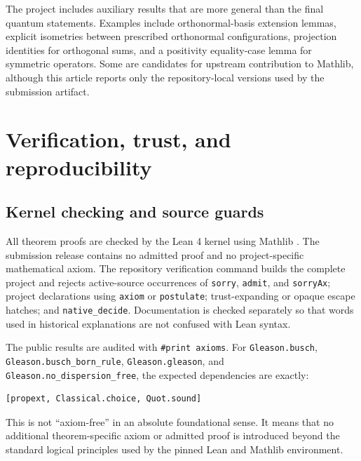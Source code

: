 \documentclass[pdflatex,sn-mathphys-num]{sn-jnl}
\providecommand{\passthrough}[1]{#1}
\theoremstyle{thmstyleone}
\theoremstyle{thmstylethree}
\begin{document}
The project includes auxiliary results that are more general than the final quantum statements. Examples include orthonormal-basis extension lemmas, explicit isometries between prescribed orthonormal configurations, projection identities for orthogonal sums, and a positivity equality-case lemma for symmetric operators. Some are candidates for upstream contribution to Mathlib, although this article reports only the repository-local versions used by the submission artifact.

\section{Verification, trust, and reproducibility}\label{sec:verification}

\subsection{Kernel checking and source guards}\label{kernel-checking-and-source-guards}

All theorem proofs are checked by the Lean 4 kernel \cite{demoura2021} using Mathlib \cite{mathlib2020}. The submission release contains no admitted proof and no project-specific mathematical axiom. The repository verification command builds the complete project and rejects active-source occurrences of \passthrough{\lstinline!sorry!}, \passthrough{\lstinline!admit!}, and \passthrough{\lstinline!sorryAx!}; project declarations using \passthrough{\lstinline!axiom!} or \passthrough{\lstinline!postulate!}; trust-expanding or opaque escape hatches; and \passthrough{\lstinline!native_decide!}. Documentation is checked separately so that words used in historical explanations are not confused with Lean syntax.

The public results are audited with \passthrough{\lstinline!#print axioms!}. For \passthrough{\lstinline!Gleason.busch!}, \passthrough{\lstinline!Gleason.busch_born_rule!}, \passthrough{\lstinline!Gleason.gleason!}, and \passthrough{\lstinline!Gleason.no_dispersion_free!}, the expected dependencies are exactly:

\begin{lstlisting}
[propext, Classical.choice, Quot.sound]
\end{lstlisting}

This is not ``axiom-free'' in an absolute foundational sense. It means that no additional theorem-specific axiom or admitted proof is introduced beyond the standard logical principles used by the pinned Lean and Mathlib environment.
\end{document}
